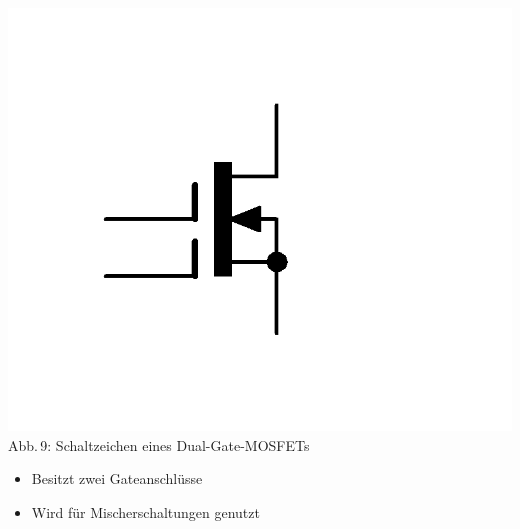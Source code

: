 \begin{frame}
	\begin{center}
		\includegraphics[width=\textwidth,height=.6\textheight,keepaspectratio]{a06/Dual-Gate-MOSFET.png}\\
		{\tiny Abb.\,9: Schaltzeichen eines Dual-Gate-MOSFETs}
	\end{center}
	\begin{itemize}
		\item Besitzt zwei Gateanschlüsse
		\item Wird für Mischerschaltungen genutzt
	\end{itemize}
\end{frame}

